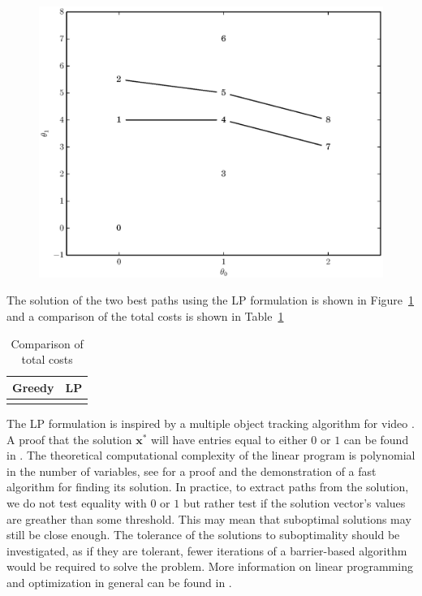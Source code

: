 \begin{figure}[!t]
    \caption{\label{plot:simple_graph_lp_paths}}
    \centering
    \includegraphics[width=\figwidthscale\textwidth]{plots/small_graph_ex_lp_paths.eps}
    \CaptionWithTitle{%
    }{}
\end{figure}

The solution of the two best paths using the LP formulation
is shown in Figure~\ref{plot:simple_graph_lp_paths} and a comparison of the
total costs is shown in Table~\ref{tab:greedy_lp_cost_compare}

\begin{table}
    \caption{\label{tab:greedy_lp_cost_compare} Comparison of total costs}
    \begin{center}
        \begin{tabular}{c c}
            Greedy & LP \\
            \hline
             &
             \\
        \end{tabular}
    \end{center}
\end{table}

The LP formulation is inspired by a multiple object tracking algorithm for video
\cite{jiang2007linear}. A proof that the solution $\boldsymbol{x}^{\ast}$ will
have entries equal to either $0$ or $1$ can be found in
\cite[p.~167]{parker1988discrete}. The theoretical computational complexity of
the linear program is polynomial in the number of variables, see
\cite{karmarkar1984new} for a proof and the demonstration of a fast algorithm
for finding its solution. In practice, to extract paths from the solution, we do
not test equality with $0$ or $1$ but rather test if the solution vector's
values are greather than some threshold. This may mean that suboptimal solutions
may still be close enough. The tolerance of the solutions to suboptimality
should be investigated, as if they are tolerant, fewer iterations of a
barrier-based algorithm would be required to solve the problem. More information
on linear programming and optimization in general can be found in
\cite{boyd2004convex}.


